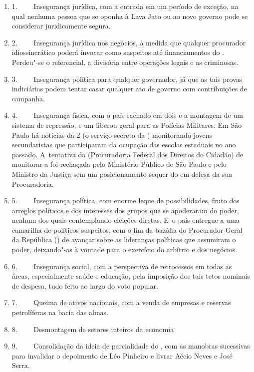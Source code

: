 \begin{enumerate}
\itemsep1pt\parskip0pt
\item
  1.~~~~ Insegurança jurídica, com a entrada em um período de exceção,
  na qual nenhuma pessoa que se oponha à Lava Jato ou ao novo governo
  pode se considerar juridicamente segura.
\item
  2.~~~~ Insegurança jurídica nos negócios, à medida que qualquer
  procurador idiossincrático poderá invocar como suspeitos até
  financiamentos do . Perdeu"-se o referencial, a divisória entre
  operações legais e as criminosas.
\item
  3.~~~~ Insegurança política para qualquer governador, já que as tais
  provas indiciárias podem tentar casar qualquer ato de governo com
  contribuições de campanha.
\item
  4.~~~~ Insegurança física, com o país rachado em dois e a montagem de
  um sistema de repressão, e um liberou geral para as Polícias
  Militares. Em São Paulo há notícias da 2 (o serviço secreto da )
  monitorando jovens secundaristas que participaram da ocupação das
  escolas estaduais no ano passado. A~tentativa da  (Procuradoria
  Federal dos Direitos do Cidadão) de monitorar a  foi rechaçada pelo
  Ministério Público de São Paulo e pelo Ministro da Justiça sem um
  posicionamento sequer do  em defesa da sua Procuradoria.
\item
  5.~~~~ Insegurança política, com enorme leque de possibilidades, fruto
  dos arreglos políticos e dos interesses dos grupos que se apoderaram
  do poder, nenhum dos quais contemplando eleições diretas. E~o país
  entregue a uma camarilha de políticos suspeitos, com o fim da bazófia
  do Procurador Geral da República () de avançar sobre as lideranças
  políticas que assumiram o poder, deixando"-as à vontade para o
  exercício do arbítrio e dos negócios.
\item
  6.~~~~ Insegurança social, com a perspectiva de retrocessos em todas
  as áreas, especialmente saúde e educação, pela imposição dos tais
  tetos nominais de despesa, tudo feito ao largo do voto popular.
\item
  7.~~~~ Queima de ativos nacionais, com a venda de empresas e reservas
  petrolíferas na bacia das almas.
\item
  8.~~~~ Desmontagem de setores inteiros da economia
\item
  9.~~~~ Consolidação da ideia de parcialidade do , com as manobras
  sucessivas para invalidar o depoimento de Léo Pinheiro e livrar Aécio
  Neves e José Serra.
\end{enumerate}

